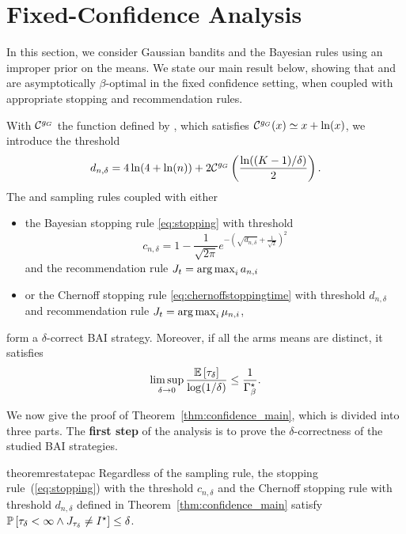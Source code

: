 \section{Fixed-Confidence Analysis}\label{sec:t3c.confidence}

In this section, we consider Gaussian bandits and the Bayesian rules using an improper prior on the means.
We state our main result below, showing that \TTTS and \TCC are asymptotically $\beta$-optimal in the fixed confidence setting, when coupled with appropriate stopping and recommendation rules. 

\begin{theorem}\label{thm:confidence_main} With $\mathcal{C}^{g_G}$ the function defined by \cite{kaufmann2018mixture}, which satisfies $\mathcal{C}^{g_G}(x) \simeq x+\ln(x)$, we introduce the threshold
\begin{equation}d_{n,\delta} = 4\ln(4+\ln(n)) + 2 \mathcal{C}^{g_G}\left(\frac{\ln((K-1)/\delta)}{2}\right).\label{def:thresholdD}\end{equation}
The \TTTS and \TCC sampling rules coupled with either   
\begin{itemize}
 \item the Bayesian stopping rule \eqref{eq:stopping} with threshold \[c_{n,\delta} = 1 - \frac{1}{\sqrt{2\pi}} e^{-\left(\sqrt{d_{n,\delta}} + \frac{1}{\sqrt{2}}\right)^2}\]
 and the recommendation rule $J_t = \operatorname*{arg\,max}_{i} a_{n,i}$
  \item or the Chernoff stopping rule \eqref{eq:chernoffstoppingtime} with threshold $d_{n,\delta}$
 and recommendation rule $J_t = \operatorname*{arg\,max}_i \mu_{n,i}$,
\end{itemize}
form a $\delta$-correct BAI strategy. Moreover, if all the arms means are distinct, it satisfies  
    \[
        \limsup_{\delta\rightarrow{0}} \frac{\mathbb{E}\left[\tau_{\delta}\right]}{\log(1/\delta)} \leq \frac{1}{\Gamma_{\beta}^\star}.
    \]
\end{theorem}

We now give the proof of Theorem~\ref{thm:confidence_main}, which is divided into three parts. The \textbf{first step} of the analysis is to prove the $\delta$-correctness of the studied BAI strategies.

\begin{restatable}{theorem}{restatepac}\label{thm:pac_gaussian}
    Regardless of the sampling rule, the stopping rule~(\ref{eq:stopping}) with the threshold $c_{n,\delta}$ and the Chernoff stopping rule with threshold $d_{n,\delta}$ defined in Theorem~\ref{thm:confidence_main} satisfy $        \mathbb{P}\left[\tau_{\delta} < \infty \wedge J_{\tau_{\delta}} \neq I^\star\right] \leq \delta$.
\end{restatable}

